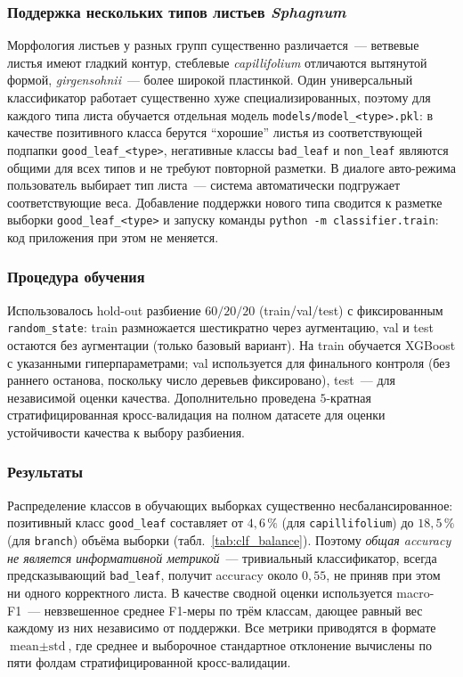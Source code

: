 \subsubsection*{Поддержка нескольких типов листьев \textit{Sphagnum}}

Морфология листьев у разных групп существенно различается~--- ветвевые листья
имеют гладкий контур, стеблевые \textit{capillifolium} отличаются вытянутой
формой, \textit{girgensohnii}~--- более широкой пластинкой. Один универсальный
классификатор работает существенно хуже специализированных, поэтому для каждого
типа листа обучается отдельная модель \texttt{models/model\_<type>.pkl}: в качестве
позитивного класса берутся ``хорошие'' листья из соответствующей подпапки
\texttt{good\_leaf\_<type>}, негативные классы \texttt{bad\_leaf} и
\texttt{non\_leaf} являются общими для всех типов и не требуют повторной
разметки. В диалоге авто-режима пользователь выбирает тип листа~--- система
автоматически подгружает соответствующие веса. Добавление поддержки нового типа
сводится к разметке выборки \texttt{good\_leaf\_<type>} и запуску команды
\texttt{python -m classifier.train}: код приложения при этом не меняется.

\subsubsection*{Процедура обучения}

Использовалось hold-out разбиение $60/20/20$ (train/val/test) с фиксированным
\texttt{random\_state}: train размножается шестикратно через аугментацию,
val и test остаются без аугментации (только базовый вариант). На train
обучается XGBoost с указанными гиперпараметрами; val используется для
финального контроля (без раннего останова, поскольку число деревьев фиксировано),
test~--- для независимой оценки качества. Дополнительно проведена $5$-кратная
стратифицированная кросс-валидация на полном датасете для оценки устойчивости
качества к выбору разбиения.

\subsubsection*{Результаты}

Распределение классов в обучающих выборках существенно несбалансированное:
позитивный класс \texttt{good\_leaf} составляет от $4{,}6\,\%$ (для
\texttt{capillifolium}) до $18{,}5\,\%$ (для \texttt{branch}) объёма выборки
(табл.~\ref{tab:clf_balance}). Поэтому \emph{общая accuracy не является
информативной метрикой}~--- тривиальный классификатор, всегда предсказывающий
\texttt{bad\_leaf}, получит accuracy около $0{,}55$, не приняв при этом ни
одного корректного листа. В качестве сводной оценки используется macro-F1~---
невзвешенное среднее F1-меры по трём классам, дающее равный вес каждому из них
независимо от поддержки. Все метрики приводятся в формате
$\text{mean} \pm \text{std}$, где среднее и выборочное стандартное отклонение
вычислены по пяти фолдам стратифицированной кросс-валидации.


